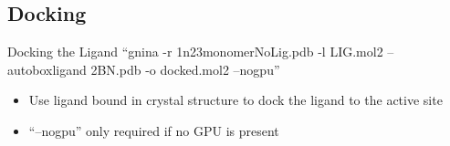 \subsection{Docking}
\begin{frame}{Docking the Ligand}
\enquote{gnina -r 1n23\textunderscore monomer\textunderscore NoLig.pdb -l LIG.mol2 --autobox\textunderscore ligand 2BN.pdb  -o docked.mol2 --no\textunderscore gpu}\vspace{2cm}

\begin{itemize}
	\item Use ligand bound in crystal structure to dock the ligand to the active site
	\item \enquote{--no\textunderscore gpu} only required if no GPU is present
\end{itemize}
\end{frame}